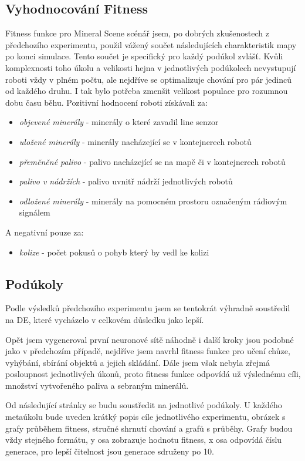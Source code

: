 \subsection{Vyhodnocování Fitness}
Fitness funkce pro Mineral Scene scénář jsem, po dobrých zkušenostech z předchozího experimentu, použil vážený součet následujících charakteristik mapy po konci simulace. Tento součet je specifický pro každý podúkol zvlášť. Kvůli komplexnosti toho úkolu a velikosti hejna v jednotlivých podúkolech nevystupují roboti vždy v plném počtu, ale nejdříve se optimalizuje chování pro pár jedinců od každého druhu. I tak bylo potřeba zmenšit velikost populace pro rozumnou dobu času běhu. Pozitivní hodnocení roboti získávali za: 
\begin{itemize}
	\item \textit{objevené minerály} - minerály o které zavadil line senzor
	\item \textit{uložené minerály} - minerály nacházející se v kontejnerech robotů 
	\item \textit{přeměněné palivo} - palivo nacházející se na mapě či v kontejnerech robotů
	\item \textit{palivo v nádržích} - palivo uvnitř nádrží jednotlivých robotů
	\item \textit{odložené minerály} - minerály na pomocném prostoru označeným rádiovým signálem
\end{itemize}
A negativní pouze za: 
\begin{itemize}
	\item \textit{kolize} - počet pokusů o pohyb který by vedl ke kolizi
\end{itemize}
\subsection{Podúkoly}
Podle výsledků předchozího experimentu jsem se tentokrát výhradně soustředil na DE, které vycházelo v celkovém důsledku jako lepší.
\par 
Opět jsem vygeneroval první neuronové sítě náhodně i další kroky jsou podobné jako v předchozím případě, nejdříve jsem navrhl fitness funkce pro učení chůze, vyhýbání, sbírání objektů a jejich skládání. Dále jsem však nebyla zřejmá posloupnost jednotlivých úkonů, proto fitness funkce odpovídá už výslednému cíli, množství vytvořeného paliva a sebraným minerálů.
\par 
Od následující stránky se budu soustředit na jednotlivé podúkoly. U každého metaúkolu bude uveden krátký popis cíle jednotlivého experimentu, obrázek s grafy průběhem fitness, stručné shrnutí chování a grafů s průběhy. Grafy budou vždy stejného formátu,  y osa zobrazuje hodnotu fitness, x osa odpovídá číslu generace, pro lepší čitelnost jsou generace sdruženy po 10. 
\clearpage

